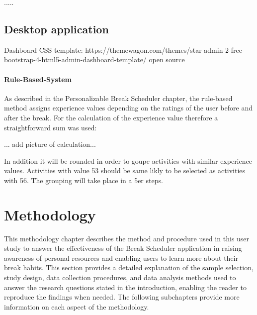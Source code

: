 \documentclass{hasel_thesis}
\begin{document}
.....

\section{Desktop application}
Dashboard CSS template: https://themewagon.com/themes/star-admin-2-free-bootstrap-4-html5-admin-dashboard-template/ open source

\subsubsection{Rule-Based-System}
As described in the Personalizable Break Scheduler chapter, the rule-based method assigns experience values depending on the ratings of the user before and after the break. For the calculation of the experience value therefore a straightforward sum was used:

... add picture of calculation...

In addition it will be rounded in order to goupe activities with similar experience values. Activities with value 53 should be same likly to be selected as activities with 56. The grouping will take place in a 5er steps.

\chapter{Methodology}
This methodology chapter describes the method and procedure used in this user study to answer the effectiveness of the Break Scheduler application in raising awareness of personal resources and enabling users to learn more about their break habits. This section provides a detailed explanation of the sample selection, study design, data collection procedures, and data analysis methods used to answer the research questions stated in the introduction, enabling the reader to reproduce the findings when needed. The following subchapters provide more information on each aspect of the methodology.
\end{document}
